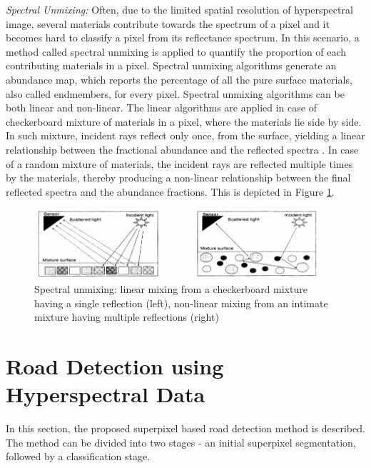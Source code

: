 \documentclass[12pt,twoside]{article}
\theoremstyle{plain}
\theoremstyle{definition}
\theoremstyle{remark}
\newcommand{\forceindent}{\leavevmode{\parindent=2em\indent}}
\begin{document}
\forceindent \textit{Spectral Unmixing:} Often, due to the limited spatial resolution of hyperspectral image, several materials contribute towards the spectrum of a pixel and it becomes hard to classify a pixel from its reflectance spectrum. In this scenario, a method called spectral unmixing is applied to quantify the proportion of each contributing materials in a pixel. Spectral unmixing algorithms generate an abundance map, which reports the percentage of all the pure surface materials, also called endmembers, for every pixel. Spectral unmixing algorithms can be both linear and non-linear. The linear algorithms are applied in case of  checkerboard mixture of materials in a pixel, where the materials lie side by side. In such mixture, incident rays reflect only once, from the surface, yielding a linear relationship between the fractional abundance and the reflected spectra \cite{keshava2000algorithm}. In case of a random mixture of materials, the incident rays are reflected multiple times by the materials, thereby producing a non-linear relationship between the final reflected spectra and the abundance fractions. This is depicted in Figure \ref{fig:unmix}.
\begin{figure}[hbtp]
\centering
\includegraphics[width=0.95\textwidth]{src/spectral_unmixing.png}
\caption{Spectral unmixing: linear mixing from a checkerboard mixture having a single reflection (left), non-linear mixing from an intimate mixture having multiple reflections (right) \cite{keshava2000algorithm}}
\label{fig:unmix}
\end{figure}

\section{Road Detection using Hyperspectral Data}
\label{sec:model}
In this section, the proposed superpixel based road detection method is described. The method can be divided into two stages - an initial superpixel segmentation, followed by a classification stage. 
\end{document}
